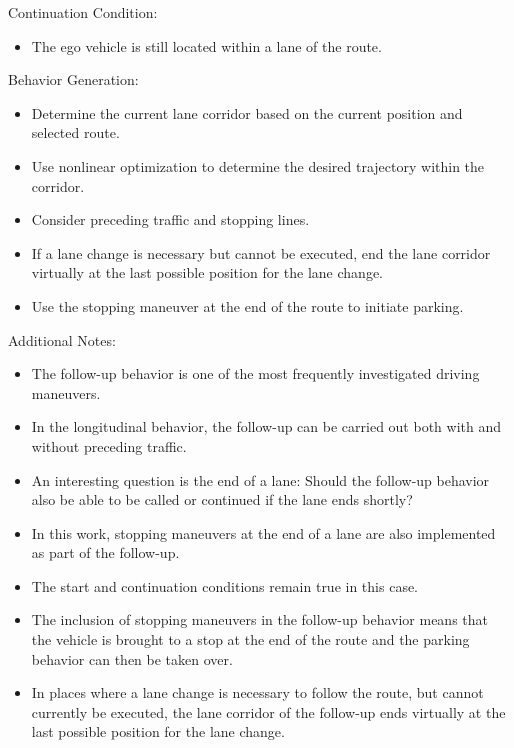 Continuation Condition:

\begin{itemize}
    \item The ego vehicle is still located within a lane of the route.
\end{itemize}

Behavior Generation:

\begin{itemize}
    \item Determine the current lane corridor based on the current position and selected route.
    \item Use nonlinear optimization to determine the desired trajectory within the corridor.
    \item Consider preceding traffic and stopping lines.
    \item If a lane change is necessary but cannot be executed, end the lane corridor virtually at the last possible position for the lane change.
    \item Use the stopping maneuver at the end of the route to initiate parking.
\end{itemize}

Additional Notes:

\begin{itemize}
    \item The follow-up behavior is one of the most frequently investigated driving maneuvers.
    \item In the longitudinal behavior, the follow-up can be carried out both with and without preceding traffic.
    \item An interesting question is the end of a lane: Should the follow-up behavior also be able to be called or continued if the lane ends shortly?
    \item In this work, stopping maneuvers at the end of a lane are also implemented as part of the follow-up.
    \item The start and continuation conditions remain true in this case.
    \item The inclusion of stopping maneuvers in the follow-up behavior means that the vehicle is brought to a stop at the end of the route and the parking behavior can then be taken over.
    \item In places where a lane change is necessary to follow the route, but cannot currently be executed, the lane corridor of the follow-up ends virtually at the last possible position for the lane change.
\end{itemize}


